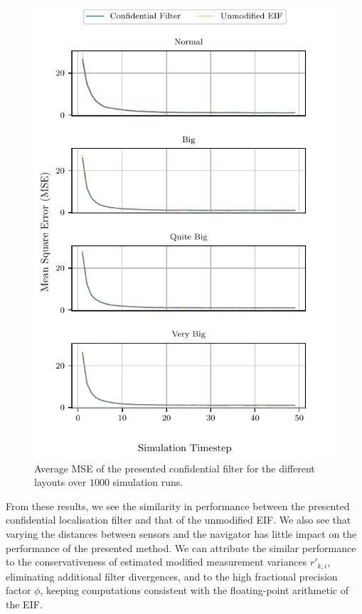 \begin{figure}[htbp]
    \centering
    \includegraphics{figures/nonlin_fusion_simulation_layout_errors.pdf}
    \caption{Average MSE of the presented confidential filter for the different layouts over $1000$ simulation runs.}
    \label{fig:nonlin_fusion:simulation_layout_errors}
\end{figure}
From these results, we see the similarity in performance between the presented confidential localisation filter and that of the unmodified EIF. We also see that varying the distances between sensors and the navigator has little impact on the performance of the presented method. We can attribute the similar performance to the conservativeness of estimated modified measurement variances $r'_{k, i}$, eliminating additional filter divergences, and to the high fractional precision factor $\phi$, keeping computations consistent with the floating-point arithmetic of the EIF.


